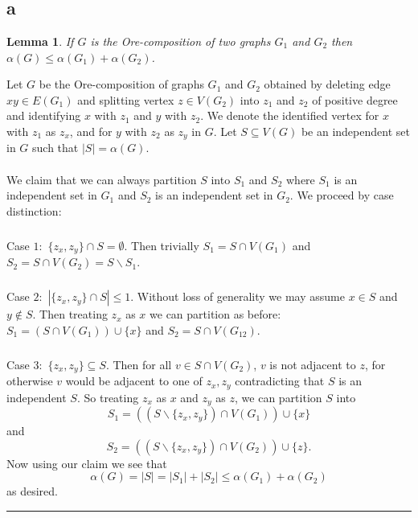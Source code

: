 \documentclass[letterpaper,12pt,oneside,onecolumn]{article}
\newenvironment{proof}{{\bf Proof:  }}{\hfill\rule{2mm}{2mm}}
\newtheorem{lemma}[fact]{Lemma}
\begin{document}
\newpage
\section{}
\subsection{a}
\begin{lemma}
	If $G$ is the Ore-composition of two graphs $G_1$ and $G_2$ then $\alpha(G) \leq \alpha(G_1) + \alpha(G_2)$.
\end{lemma}
\begin{proof}
Let $G$ be the Ore-composition of graphs $G_1$ and $G_2$ obtained by deleting edge $xy \in E(G_1)$ and splitting vertex $z \in V(G_2)$ into $z_1$ and $z_2$ of positive degree and identifying $x$ with $z_1$ and $y$ with $z_2$. We denote the identified vertex for $x$ with $z_1$ as $z_x$, and for $y$ with $z_2$ as $z_y$ in $G$. Let $S \subseteq V(G)$ be an independent set in $G$ such that $|S| = \alpha (G)$. 
\paragraph{}
We claim that we can always partition $S$ into $S_1$ and $S_2$ where $S_1$ is an independent set in $G_1$ and $S_2$ is an independent set in $G_2$. We proceed by case distinction:
\subparagraph{} Case $1:$ $\{z_x,z_y\} \cap S = \emptyset$. Then trivially $S_1 = S \cap V(G_1)$ and $S_2 = S\cap V(G_2) = S \backslash S_1$.
\subparagraph{} Case $2:$ $|\{z_x,z_y\} \cap S| \leq 1$. Without loss of generality we may assume $x \in S$ and  $y \not\in S$. Then treating $z_x$ as $x$ we can partition as before: $S_1 = (S \cap V(G_1)) \cup \{x\}$ and $S_2 = S\cap V(G_12)$.
\subparagraph{} Case $3:$ $\{z_x, z_y\} \subseteq S$. Then for all $v \in S\cap V(G_2)$, $v$ is not adjacent to $z$, for otherwise $v$ would be adjacent to one of $z_x, z_y$ contradicting that $S$ is an independent $S$. So treating $z_x$ as $x$ and $z_y$ as $z$, we can partition $S$ into $$S_1 = ((S\backslash\{z_x,z_y\})\cap V(G_1)) \cup \{x\}$$ and $$S_2 = ((S\backslash\{z_x,z_y\})\cap V(G_2)) \cup \{z\}.$$
Now using our claim we see that
$$\alpha(G) = |S| = |S_1| + |S_2| \leq \alpha(G_1) + \alpha(G_2)$$
as desired.
\end{proof}
\end{document}

